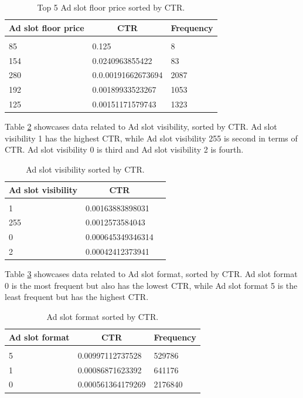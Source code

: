\documentclass{article} %
\begin{document}
\begin{table}[!htbp]
\caption{Top 5 Ad slot floor price sorted by CTR.}
\label{table:8}
\begin{center}
\begin{tabular}{l l l}
\multicolumn{1}{c}{\bf Ad slot floor price} & \multicolumn{1}{c}{\bf CTR} & \multicolumn{1}{c}{\bf Frequency}
\\ \hline \\
85  & 0.125              & 8\\
154 & 0.0240963855422    & 83\\
280 & 0.0.00191662673694 & 2087\\
192 & 0.00189933523267   & 1053\\
125 & 0.00151171579743   & 1323\\
\end{tabular}
\end{center}
\end{table}

Table \ref{table:9} showcases data related to Ad slot visibility, sorted by CTR. Ad slot visibility 1 has the highest CTR, while Ad slot visibility 255 is second in terms of CTR. Ad slot visibility 0 is third and Ad slot visibility 2 is fourth.

\begin{table}[!htbp]
\caption{Ad slot visibility sorted by CTR.}
\label{table:9}
\begin{center}
\begin{tabular}{l l l}
\multicolumn{1}{c}{\bf Ad slot visibility} & \multicolumn{1}{c}{\bf CTR}
\\ \hline \\
1   & 0.00163883898031\\
255 & 0.0012573584043\\
0   & 0.000645349346314\\
2   & 0.00042412373941\\
\end{tabular}
\end{center}
\end{table}

Table \ref{table:10} showcases data related to Ad slot format, sorted by CTR. Ad slot format 0 is the most frequent but also has the lowest CTR, while Ad slot format 5 is the least frequent but has the highest CTR.

\begin{table}[!htbp]
\caption{Ad slot format sorted by CTR.}
\label{table:10}
\begin{center}
\begin{tabular}{l l l}
\multicolumn{1}{c}{\bf Ad slot format} & \multicolumn{1}{c}{\bf CTR} & \multicolumn{1}{c}{\bf Frequency}
\\ \hline \\
5 & 0.00997112737528  & 529786\\
1 & 0.00086871623392  & 641176\\
0 & 0.000561364179269 & 2176840\\
\end{tabular}
\end{center}
\end{table}
\end{document}

